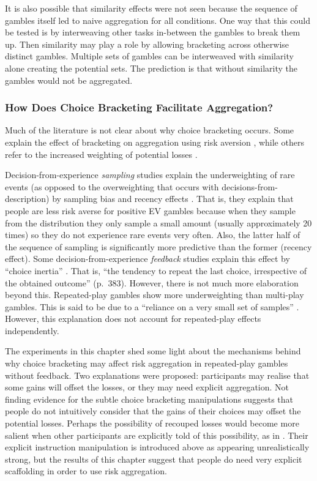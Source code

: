 \documentclass[a4paper, nobind]{templates/ociamthesis}
\theoremstyle{definition}
\theoremstyle{definition}
\theoremstyle{definition}
\theoremstyle{definition}
\theoremstyle{remark}
\begin{document}
It is also possible that similarity effects were not seen because the sequence
of gambles itself led to naive aggregation for all conditions. One way that this
could be tested is by interweaving other tasks in-between the gambles to break
them up. Then similarity may play a role by allowing bracketing across otherwise
distinct gambles. Multiple sets of gambles can be interweaved with similarity
alone creating the potential sets. The prediction is that without similarity the
gambles would not be aggregated.

\subsubsection{How Does Choice Bracketing Facilitate Aggregation?}

Much of the literature \autocite[e.g.,][]{benartzi1999} is not clear about why choice
bracketing occurs. Some explain the effect of bracketing on aggregation using
risk aversion \autocite[e.g.,][]{read1999}, while others refer to the increased weighting
of potential losses \autocite{webb2017}.

Decision-from-experience \emph{sampling} studies explain the underweighting of rare
events (as opposed to the overweighting that occurs with
decisions-from-description) by sampling bias and recency effects \autocites[e.g.,][]{hertwig2004,wulff2018}. That is, they explain that people are less risk
averse for positive EV gambles because when they sample from the distribution
they only sample a small amount (usually approximately 20 times) so they do not
experience rare events very often. Also, the latter half of the sequence of
sampling is significantly more predictive than the former (recency effect). Some
decision-from-experience \emph{feedback} studies explain this effect by ``choice
inertia'' \autocite{camilleri2011}. That is, ``the tendency to repeat the last choice,
irrespective of the obtained outcome'' (p.~383). However, there is not much more
elaboration beyond this. Repeated-play gambles show more underweighting than
multi-play gambles. This is said to be due to a ``reliance on a very small set of
samples'' \autocite[p.~64]{camilleri2013}. However, this explanation does not account for
repeated-play effects independently.

The experiments in this chapter shed some light about the mechanisms behind why
choice bracketing may affect risk aggregation in repeated-play gambles without
feedback. Two explanations were proposed: participants may realise that some
gains will offset the losses, or they may need explicit aggregation. Not finding
evidence for the subtle choice bracketing manipulations suggests that people do
not intuitively consider that the gains of their choices may offset the
potential losses. Perhaps the possibility of recouped losses would become more
salient when other participants are explicitly told of this possibility, as in
\textcite{sokolhessner2009}. Their explicit instruction manipulation is introduced above
as appearing unrealistically strong, but the results of this chapter suggest
that people do need very explicit scaffolding in order to use risk aggregation.
\end{document}
